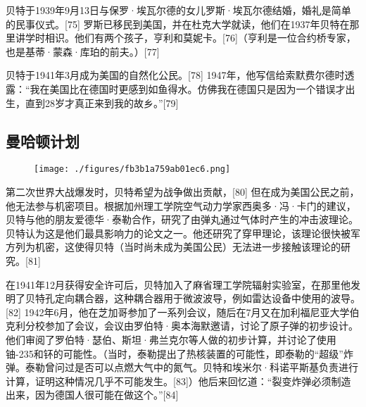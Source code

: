 贝特于1939年9月13日与保罗·埃瓦尔德的女儿罗斯·埃瓦尔德结婚，婚礼是简单的民事仪式。[75] 罗斯已移民到美国，并在杜克大学就读，他们在1937年贝特在那里讲学时相识。他们有两个孩子，亨利和莫妮卡。[76]（亨利是一位合约桥专家，也是基蒂·蒙森·库珀的前夫。）[77]

贝特于1941年3月成为美国的自然化公民。[78] 1947年，他写信给索默费尔德时透露：“我在美国比在德国时更感到如鱼得水。仿佛我在德国只是因为一个错误才出生，直到28岁才真正来到我的故乡。”[79]
\subsection{曼哈顿计划}\begin{figure}[ht]
\centering
\texttt{[image: ./figures/fb3b1a759ab01ec6.png]}
\caption{} \label{fig_Hans_4}
\end{figure}
第二次世界大战爆发时，贝特希望为战争做出贡献，[80] 但在成为美国公民之前，他无法参与机密项目。根据加州理工学院空气动力学家西奥多·冯·卡门的建议，贝特与他的朋友爱德华·泰勒合作，研究了由弹丸通过气体时产生的冲击波理论。贝特认为这是他们最具影响力的论文之一。他还研究了穿甲理论，该理论很快被军方列为机密，这使得贝特（当时尚未成为美国公民）无法进一步接触该理论的研究。[81]

在1941年12月获得安全许可后，贝特加入了麻省理工学院辐射实验室，在那里他发明了贝特孔定向耦合器，这种耦合器用于微波波导，例如雷达设备中使用的波导。[82] 1942年6月，他在芝加哥参加了一系列会议，随后在7月又在加利福尼亚大学伯克利分校参加了会议，会议由罗伯特·奥本海默邀请，讨论了原子弹的初步设计。他们审阅了罗伯特·瑟伯、斯坦·弗兰克尔等人做的初步计算，并讨论了使用铀-235和钚的可能性。（当时，泰勒提出了热核装置的可能性，即泰勒的“超级”炸弹。泰勒曾问过是否可以点燃大气中的氮气。贝特和埃米尔·科诺平斯基负责进行计算，证明这种情况几乎不可能发生。[83]）他后来回忆道：“裂变炸弹必须制造出来，因为德国人很可能在做这个。”[84]